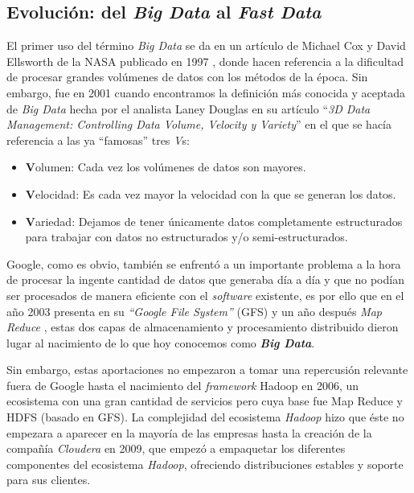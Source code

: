 \subsection{Evolución: del \textit{Big Data} al \textit{Fast Data}}

El primer uso del término  \textit{Big Data}  se da en un artículo de Michael Cox y David Ellsworth de la NASA publicado en 1997 \cite{Cox_1997}, donde hacen referencia a la dificultad de procesar grandes volúmenes de datos con los métodos de la época. Sin embargo, fue en 2001 cuando encontramos la definición más conocida y aceptada de \textit{Big Data} hecha por el analista Laney Douglas en su artículo ``\textit{3D Data Management: Controlling Data Volume, Velocity y Variety}'' \cite{laneay_2013} en el que se hacía referencia a las ya ``famosas'' tres \textit{V}s:

\begin{itemize}
	\item \textbf{V}olumen:  Cada vez los volúmenes de datos son mayores.
	\item \textbf{V}elocidad: Es cada vez mayor la velocidad con la que se generan los datos.  
	\item \textbf{V}ariedad: Dejamos de tener únicamente datos completamente estructurados para trabajar con datos no estructurados y/o  semi-estructurados. 
\end{itemize} 


Google, como es obvio, también  se enfrentó a un importante problema a la hora de procesar la ingente cantidad de datos que generaba día a día y que no podían ser procesados de manera eficiente con el \textit{software} existente, es por ello que en el año 2003 presenta en \cite{GFS} su  \textit{``Google File System''} (GFS) y un año después \textit{Map Reduce} \cite{MapReduce}, estas dos capas de almacenamiento y procesamiento distribuido dieron lugar al nacimiento de lo que hoy conocemos como \textit{\textbf{Big Data}}.

Sin embargo, estas aportaciones no empezaron a tomar una repercusión relevante fuera de Google hasta el nacimiento del \textit{framework} Hadoop en 2006, un ecosistema con una gran cantidad de servicios pero cuya base fue Map Reduce y HDFS (basado en GFS). La complejidad del ecosistema \textit{Hadoop} hizo que éste no empezara a aparecer en la mayoría de las empresas hasta la creación de la compañía \textit{Cloudera} en 2009, que empezó a empaquetar los diferentes componentes del ecosistema \textit{Hadoop}, ofreciendo distribuciones estables y soporte para sus clientes. 


